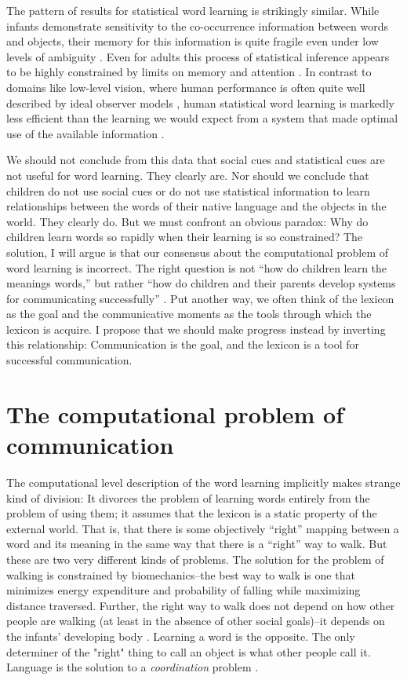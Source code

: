 \documentclass[review]{elsarticle}
\begin{document}
The pattern of results for statistical word learning is strikingly similar. While infants demonstrate sensitivity to the co-occurrence information between words and objects, their memory for this information is quite fragile even under low levels of ambiguity \cite{vlach2013,vouloumanos2009}. Even for adults this process of statistical inference appears to be highly constrained by limits on memory and attention \cite{smith2011,trueswell2013,yurovsky2015}. In contrast to domains like low-level vision, where human performance is often quite well described by ideal observer models \cite[e.g.,][]{najemnik2005}, human statistical word learning is markedly less efficient than the learning we would expect from a system that made optimal use of the available information \cite{frank2009,yu2012,yurovsky2015}. 

We should not conclude from this data that social cues and statistical cues are not useful for word learning. They clearly are. Nor should we conclude that children do not use social cues or do not use statistical information to learn relationships between the words of their native language and the objects in the world. They clearly do. But we must confront an obvious paradox: Why do children learn words so rapidly when their learning is so constrained? The solution, I will argue is that our consensus about the computational problem of word learning is incorrect. The right question is not ``how do children learn the meanings words,'' but rather ``how do children and their parents develop systems for communicating successfully'' \citep{bruner1975}. Put another way, we often think of the lexicon as the goal and the communicative moments as the tools through which the lexicon is acquire. I propose that we should make progress instead by inverting this relationship: Communication is the goal, and the lexicon is a tool for successful communication. 

\section{The computational problem of communication}

The computational level description of the word learning implicitly makes strange kind of division: It divorces the problem of learning words entirely from the problem of using them; it assumes that the lexicon is a static property of the external world. That is, that there is some objectively ``right'' mapping between a word and its meaning in the same way that there is a ``right'' way to walk. But these are two very different kinds of problems. The solution for the problem of walking is constrained by biomechanics--the best way to walk is one that minimizes energy expenditure and probability of falling while maximizing distance traversed. Further, the right way to walk does not depend on how other people are walking (at least in the absence of other social goals)--it depends on the infants' developing body \citep{cole2012,garciaguirre2007}. Learning a word is the opposite. The only determiner of the "right" thing to call an object is what other people call it. Language is the solution to a \emph{coordination} problem \citep{chater2010, schelling1980}.
\end{document}
